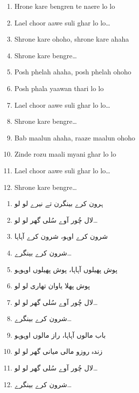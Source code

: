 \documentclass[12pt]{article}
\newcommand{\bigroman}[1]{\fontsize{16pt}{18pt}\selectfont\RaggedRight #1}
\newcommand{\bigarabic}[1]{\fontsize{16pt}{18pt}\selectfont \textarabic{#1}}
\begin{document}
\begin{multicols}{2}
\begin{enumerate}[leftmargin=*, label=\arabic*., font=\fontsize{16pt}{18pt}\selectfont]
  \item \bigroman{Hrone kare bengren te naere lo lo}
  \item \bigroman{Lael choor aawe suli ghar lo lo…}
  \item \bigroman{Shrone kare ohoho, shrone kare ahaha}
  \item \bigroman{Shrone kare bengre…}
  \item \bigroman{Posh phelah ahaha, posh phelah ohoho}
  \item \bigroman{Posh phala yaawan thari lo lo}
  \item \bigroman{Lael choor aawe suli ghar lo lo…}
  \item \bigroman{Shrone kare bengre…}
  \item \bigroman{Bab maalun ahaha, raaze maalun ohoho}
  \item \bigroman{Zinde rozu maali myani ghar lo lo}
  \item \bigroman{Lael choor aawe suli ghar lo lo…}
  \item \bigroman{Shrone kare bengre…}
\end{enumerate}

\columnbreak

\begin{RTL}
\begin{enumerate}[leftmargin=*, label=\arabic*., font=\fontsize{16pt}{18pt}\selectfont]
  \item \bigarabic{ہرون کرے بینگرن تے نیرے لو لو}
  \item \bigarabic{لال چُور آوے سُلی گھر لو لو…}
  \item \bigarabic{شرون کرے اوہو، شرون کرے آہاہا}
  \item \bigarabic{شرون کرے بینگرے…}
  \item \bigarabic{پوش پھیلوں آہاہا، پوش پھیلوں اوہوہو}
  \item \bigarabic{پوش پھلا یاوان تھاری لو لو}
  \item \bigarabic{لال چُور آوے سُلی گھر لو لو…}
  \item \bigarabic{شرون کرے بینگرے…}
  \item \bigarabic{باب مالوں آہاہا، راز مالوں اوہوہو}
  \item \bigarabic{زندہ روزو مالی میانی گھر لو لو}
  \item \bigarabic{لال چُور آوے سُلی گھر لو لو…}
  \item \bigarabic{شرون کرے بینگرے…}
\end{enumerate}
\end{RTL}
\end{multicols}
\end{document}
